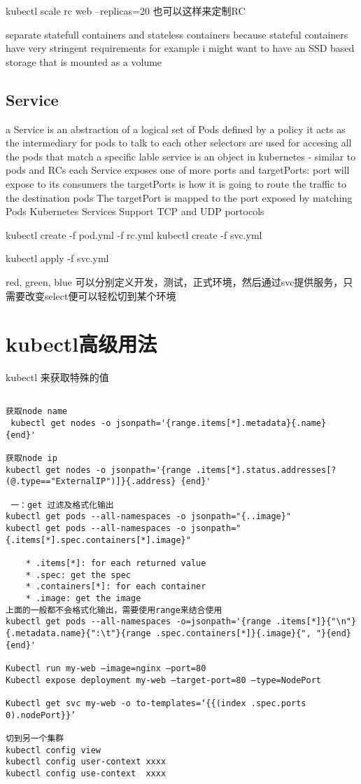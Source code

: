 kubectl scale rc web --replicas=20  
也可以这样来定制RC


separate statefull containers and stateless containers because stateful containers have very
stringent requirements for example i might want to have an SSD based storage that is mounted
as a volume 


\subsection{ Service}
a Service is an abstraction of a logical set of Pods defined by a policy
it acts as the intermediary for pods to talk to each other
selectors are used for accesing all the pods that match a specific lable
service is an object in kubernetes - similar to pods and RCs
each Service exposes one of more ports and targetPorts: port will expose to its consumers
the targetPorts is how it is going to route the traffic to the destination pods
The targetPort is mapped to the port exposed by matching Pods
Kubernetes Services Support TCP and UDP portocols


kubectl create -f pod.yml -f rc.yml 
kubectl create -f svc.yml

kubectl apply -f svc.yml


red, green, blue 可以分别定义开发，测试，正式环境，然后通过svc提供服务，只需要改变select便可以轻松切到某个环境

\section{kubectl高级用法}

kubectl 来获取特殊的值

\begin{lstlisting}

获取node name
 kubectl get nodes -o jsonpath='{range.items[*].metadata}{.name} {end}'

获取node ip
kubectl get nodes -o jsonpath='{range .items[*].status.addresses[?(@.type=="ExternalIP")]}{.address} {end}'

 一：get 过滤及格式化输出
kubectl get pods --all-namespaces -o jsonpath="{..image}"
kubectl get pods --all-namespaces -o jsonpath="{.items[*].spec.containers[*].image}"

    * .items[*]: for each returned value
    * .spec: get the spec
    * .containers[*]: for each container
    * .image: get the image
上面的一般都不会格式化输出，需要使用range来结合使用
kubectl get pods --all-namespaces -o=jsonpath='{range .items[*]}{"\n"}{.metadata.name}{":\t"}{range .spec.containers[*]}{.image}{", "}{end}{end}' 

Kubectl run my-web —image=nginx —port=80
Kubectl expose deployment my-web —target-port=80 —type=NodePort

Kubectl get svc my-web -o to-templates=‘{{(index .spec.ports 0).nodePort}}’

切到另一个集群
kubectl config view
kubectl config user-context xxxx
kubectl config use-context  xxxx

\end{lstlisting}




